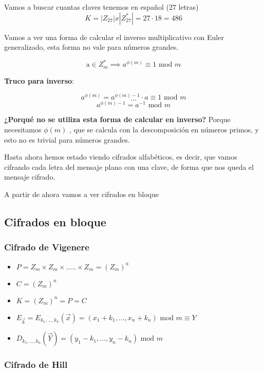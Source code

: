  
 \begin{example}
 	Vamos a buscar cuantas claves tenemos en español (27 letras)
 	$$K = |Z_{27}| x |Z^{*}_{27}| = 27\cdot 18 = 486$$
 \end{example}


Vamos a ver una forma de calcular el inverso multiplicativo con Euler generalizado, esta forma no vale para números grandes.

\begin{theorem}
	$$\text{a} \in Z^{*}_m \implies a^{\phi(m)} \equiv 1 \text{ mod } m$$
\end{theorem}

\textbf{Truco para inverso}:

$$a^{\phi(m)} = a^{\phi(m) - 1} \cdot a \equiv 1 \text{ mod } m$$
$$...$$
$$a^{\phi(m) -1} = a^{-1} \text{ mod } m$$

\textbf{¿Porqué no se utiliza esta forma de calcular en inverso?} Porque necesitamos $\phi(m)$ , que se calcula con la descomposición en números primos, y esto no es trivial para números grandes.

Hasta ahora hemos estado viendo cifrados alfabéticos, es decir, que vamos cifrando cada letra del mensaje plano con una clave, de forma que nos queda el mensaje cifrado.


A partir de ahora vamos a ver cifrados en bloque

\subsection{Cifrados en bloque}

\subsubsection{Cifrado de Vigenere}

\begin{itemize}
	\item $P= Z_m \times Z_m \times ..... \times Z_m = (Z_m)^{n}$
	\item $C = (Z_m)^{n}$
	\item $K = (Z_m)^{n} = P = C$
	\item $E_{\overrightarrow{k}} = E_{k_1,...,k_n}(\overrightarrow{x}) = (x_1+ k_1,...,x_n+ k_n) \text{ mod } m \equiv Y$
	\item $D_{k_1,...,k_n} ( \overrightarrow{Y}) = (y_1- k_1,...,y_n- k_n) \text{ mod } m $
\end{itemize}

\subsubsection{Cifrado de Hill}

